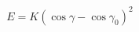 \documentclass[12pt]{article}
\begin{document}
$$
   E = K (\cos\gamma - \cos\gamma_0)^2 
$$
\end{document}
